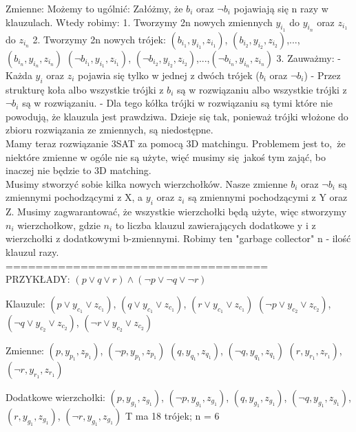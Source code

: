 \documentclass[12pt]{article}
\begin{document}
Zmienne:
Możemy to ugólnić:
Załóżmy, że $b_i$ oraz $\lnot b_i$ pojawiają się n razy w klauzulach.
Wtedy robimy:
1. Tworzymy 2n nowych zmiennych $y_{i_1}$ do $y_{i_n}$ oraz $z_{i_1}$ do $z_{i_n}$
2. Tworzymy 2n nowych trójek:
$(b_{i_1}, y_{i_1}, z_{i_1})$, $(b_{i_2}, y_{i_2}, z_{i_2})$,...,$(b_{i_n}, y_{i_n}, z_{i_n})$
$(\lnot b_{i_1}, y_{i_1}, z_{i_1})$, $(\lnot b_{i_2}, y_{i_2}, z_{i_2})$,...,$(\lnot b_{i_n}, y_{i_n}, z_{i_n})$
3. Zauważmy:
- Każda $y_i$ oraz $z_i$ pojawia się tylko w jednej z dwóch trójek ($b_i$ oraz $\lnot b_i$) 
- Przez strukturę koła albo wszystkie trójki z $b_i$ są w rozwiązaniu albo wszystkie trójki z $\lnot b_i$ są w rozwiązaniu. 
- Dla tego kółka trójki w rozwiązaniu są tymi które nie powodują, że klauzula jest prawdziwa. Dzieje się tak, ponieważ trójki włożone do zbioru rozwiązania ze zmiennych, są niedostępne.\\

Mamy teraz rozwiązanie 3SAT za pomocą 3D matchingu. Problemem jest to, że niektóre zmienne w ogóle nie są użyte, więć musimy się jakoś tym zająć, bo inaczej nie będzie to 3D matching.\\



Musimy stworzyć sobie kilka nowych wierzchołków. Nasze zmienne $b_i$ oraz $\lnot b_i$ są zmiennymi pochodzącymi z X, a $y_i$ oraz $z_i$ są zmiennymi pochodzącymi z Y oraz Z. Musimy zagwarantować, że wszystkie wierzchołki będą użyte, więc stworzymy $n_i$ wierzchołkow, gdzie $n_i$ to liczba klauzul zawierających dodatkowe y i z wierzchołki z dodatkowymi b-zmiennymi. Robimy ten "garbage collector" n - ilość klauzul razy.\\

===================================\\
PRZYKŁADY:
$(p \lor q \lor r) \land (\lnot p \lor \lnot q \lor \lnot r)$

Klauzule:
$(p \lor y_{c_1} \lor z_{c_1})$, $(q \lor y_{c_1} \lor z_{c_1})$, $(r \lor y_{c_1} \lor z_{c_1})$
$(\lnot p \lor y_{c_2} \lor z_{c_2})$, $(\lnot q \lor y_{c_2} \lor z_{c_2})$, $(\lnot r \lor y_{c_2} \lor z_{c_2})$

Zmienne:
$(p, y_{p_1}, z_{p_1})$, $(\lnot p, y_{p_1}, z_{p_1})$
$(q, y_{q_1}, z_{q_1})$, $(\lnot q, y_{q_1}, z_{q_1})$
$(r, y_{r_1}, z_{r_1})$, $(\lnot r, y_{r_1}, z_{r_1})$

Dodatkowe wierzchołki:
$(p, y_{g_1}, z_{g_1})$, $(\lnot p, y_{g_1}, z_{g_1})$, $(q, y_{g_1}, z_{g_1})$, $(\lnot q, y_{g_1}, z_{g_1})$, $(r, y_{g_1}, z_{g_1})$, $(\lnot r, y_{g_1}, z_{g_1})$
T ma 18 trójek; n = 6
\end{document}
